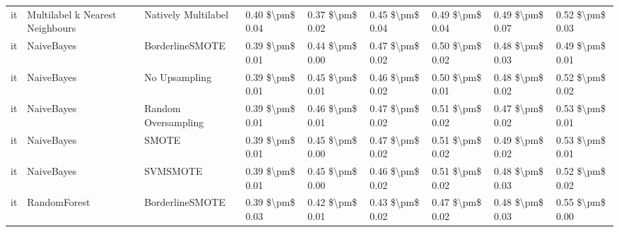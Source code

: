 \begin{tabular}{lllllllll}
      it & Multilabel k Nearest Neighbours &           Natively Multilabel & 0.40 \$\textbackslash pm\$ 0.04 &           0.37 \$\textbackslash pm\$ 0.02 &       0.45 \$\textbackslash pm\$ 0.04 &        0.49 \$\textbackslash pm\$ 0.04 &                         0.49 \$\textbackslash pm\$ 0.07 &     0.52 \$\textbackslash pm\$ 0.03 \\
      it &                      NaiveBayes &               BorderlineSMOTE & 0.39 \$\textbackslash pm\$ 0.01 &           0.44 \$\textbackslash pm\$ 0.00 &       0.47 \$\textbackslash pm\$ 0.02 &        0.50 \$\textbackslash pm\$ 0.02 &                         0.48 \$\textbackslash pm\$ 0.03 &     0.49 \$\textbackslash pm\$ 0.01 \\
      it &                      NaiveBayes &                 No Upsampling & 0.39 \$\textbackslash pm\$ 0.01 &           0.45 \$\textbackslash pm\$ 0.01 &       0.46 \$\textbackslash pm\$ 0.02 &        0.50 \$\textbackslash pm\$ 0.01 &                         0.48 \$\textbackslash pm\$ 0.02 &     0.52 \$\textbackslash pm\$ 0.02 \\
      it &                      NaiveBayes &           Random Oversampling & 0.39 \$\textbackslash pm\$ 0.01 &           0.46 \$\textbackslash pm\$ 0.01 &       0.47 \$\textbackslash pm\$ 0.02 &        0.51 \$\textbackslash pm\$ 0.02 &                         0.47 \$\textbackslash pm\$ 0.02 &     0.53 \$\textbackslash pm\$ 0.01 \\
      it &                      NaiveBayes &                         SMOTE & 0.39 \$\textbackslash pm\$ 0.01 &           0.45 \$\textbackslash pm\$ 0.00 &       0.47 \$\textbackslash pm\$ 0.02 &        0.51 \$\textbackslash pm\$ 0.02 &                         0.49 \$\textbackslash pm\$ 0.02 &     0.53 \$\textbackslash pm\$ 0.01 \\
      it &                      NaiveBayes &                      SVMSMOTE & 0.39 \$\textbackslash pm\$ 0.01 &           0.45 \$\textbackslash pm\$ 0.00 &       0.46 \$\textbackslash pm\$ 0.02 &        0.51 \$\textbackslash pm\$ 0.02 &                         0.48 \$\textbackslash pm\$ 0.03 &     0.52 \$\textbackslash pm\$ 0.02 \\
      it &                    RandomForest &               BorderlineSMOTE & 0.39 \$\textbackslash pm\$ 0.03 &           0.42 \$\textbackslash pm\$ 0.01 &       0.43 \$\textbackslash pm\$ 0.02 &        0.47 \$\textbackslash pm\$ 0.02 &                         0.48 \$\textbackslash pm\$ 0.03 &     0.55 \$\textbackslash pm\$ 0.00 \\

\end{tabular}
